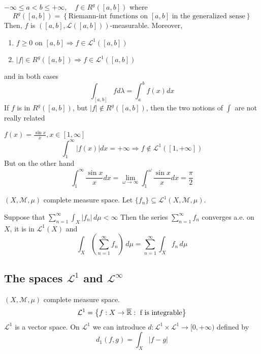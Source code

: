 \begin{theorem}
    \(-\infty \leq a < b \leq +\infty, \quad f \in R^g([a,b])\) where 
    \[
        R^g([a,b]) = \left\lbrace \mbox{Riemann-int functions on }[a,b]\mbox{ in the generalized sense} \right\rbrace
    \]
    Then, \(f\) is \(([a,b], \mathcal{L}([a,b]))\)-measurable. Moreover,
    \begin{enumerate}
        \item \(f \geq 0\) on \([a,b] \Rightarrow f \in \mathcal{L}^1([a,b])\)
        \item \(\vert f \vert \in R^g([a,b]) \Rightarrow f \in \mathcal{L}^1 ([a,b])\)
    \end{enumerate}
    and in both cases
    \[
        \int_{[a,b]} fd\lambda = \int_a^b f(x)dx
    \]
    If \(f\) is in \(R^g([a,b])\), but \(\vert f\vert \not \in R^g([a,b])\), then the two notions of \(\int\) are not really related
\end{theorem}
\begin{example}
    \(f(x) = \frac{\sin x}{x},  x \in [1, \infty]\)
    \[
        \int_1^{\infty} \vert f(x) \vert dx = +\infty \Rightarrow f \not \in \mathcal{L}^1([1, +\infty])
    \]
    But on the other hand
    \[
        \int_1^{\infty} \frac{\sin x}{x} dx = \lim_{\omega \to \infty} \int_1^{\omega} \frac{\sin x}{x} dx = \frac{\pi}{2}
    \]
\end{example}
\begin{proposition}
    \((X, \mathcal{M}, \mu)\) complete measure space. Let \(\{f_n\} \subseteq \mathcal{L}^1(X, \mathcal{M}, \mu)\). 
    
    Suppose that \(\sum_{n=1}^\infty \int_X |f_n| \, d\mu < \infty\)
    Then the series \(\sum_{n=1}^\infty f_n\) converges a.e. on \(X\), it is in \(\mathcal{L}^1(X)\) and 
    \[
        \int_X \left( \sum_{n=1}^\infty f_n  \right) \, d\mu = \sum_{n=1}^\infty \int_X f_n \, d\mu
    \]
\end{proposition}


\subsection{The spaces \texorpdfstring{\(\mathcal{L}^1\)}{L1} and \texorpdfstring{\(\mathcal{L}^\infty\)}{Linf}}
\((X, \mathcal{M}, \mu)\) complete measure space.
\[
    \mathcal{L}^1 = \left\lbrace f: X \to \overline{\mathbb{R}} : \mbox{ f is integrable}\right\rbrace
\]
\(\mathcal{L}^1\) is a vector space. On \(\mathcal{L}^1\) we can introduce \(d : \mathcal{L}^1 \times \mathcal{L}^1 \to [0, +\infty)\) defined by 
\[
    d_1 (f,g) =\int_{X} \vert f-g \vert 
\]

